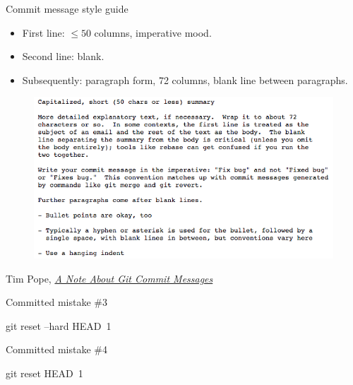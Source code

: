 \begin{frame}{Commit message style guide}
  \begin{itemize}
    \item First line: $ \le 50 $ columns, imperative mood.
    \item Second line: blank.
    \item Subsequently: paragraph form, 72 columns, blank line between
          paragraphs.
  \end{itemize}

  \begin{figure}
    \includegraphics[scale=0.35]{pope_commit_message.png}
  \end{figure}
  \footnotesize{Tim Pope,
    \href{http://tbaggery.com/2008/04/19/a-note-about-git-commit-messages.html}
         {\emph{A Note About Git Commit Messages}}}
\end{frame}

\begin{frame}[fragile]{Committed mistake \#3}
  \color{ucMaroon}{I wish the last commit never happened. Can I throw it away?}

  \begin{gitCommand}git reset --hard HEAD~1\end{gitCommand}
\end{frame}

\begin{frame}[fragile]{Committed mistake \#4}
  \color{ucMaroon}{I wish the last commit never happened, but I want
  to keep the current stuff in the working tree.}

  \begin{gitCommand}git reset HEAD~1\end{gitCommand}
\end{frame}

